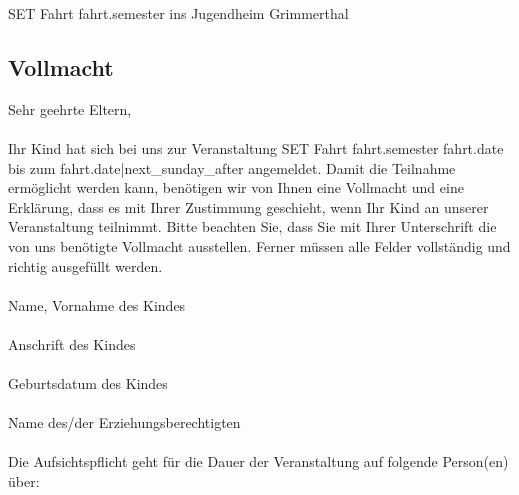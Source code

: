 {%
{%
{%

{%
SET Fahrt {{ fahrt.semester }} ins Jugendheim Grimmerthal {%

{%
\begin{Form}
    \subsection*{Vollmacht}
    Sehr geehrte Eltern,\\
    \\
    Ihr Kind hat sich bei uns zur Veranstaltung SET Fahrt {{ fahrt.semester }} {{ fahrt.date }} bis zum {{ fahrt.date|next_sunday_after }} angemeldet. Damit die Teilnahme ermöglicht werden kann, benötigen wir von Ihnen eine
    Vollmacht und eine Erklärung, dass es mit Ihrer Zustimmung geschieht, wenn Ihr Kind an unserer
    Veranstaltung teilnimmt. Bitte beachten Sie, dass Sie mit Ihrer Unterschrift die von uns benötigte
    Vollmacht ausstellen. Ferner müssen alle Felder vollständig und richtig ausgefüllt werden.\\
    \\
    \TextField[charsize={12pt},multiline=true,height={1cm},width={\linewidth},name={name1},bordercolor={0.2 0.2 0.7},default={ {{ participant.surname|latex_escape }}, {{ participant.firstname|latex_escape }}}]{}\newline
    Name, Vornahme des Kindes\\
    \\
    \TextField[charsize={12pt},multiline=true,height={1cm},width={\linewidth},name={adress},bordercolor={0.2 0.2 0.7}]{}\newline
    Anschrift des Kindes\\
    \\
    \TextField[charsize={12pt},multiline=true,height={1cm},width={\linewidth},name={birthday},bordercolor={0.2 0.2 0.7},default={ {{ participant.birthday }}}]{}\newline
    Geburtsdatum des Kindes\\
    \\
    \TextField[charsize={12pt},multiline=true,height={1cm},width={\linewidth},name={guardian1},bordercolor={0.2 0.2 0.7}]{}\newline
    Name des/der Erziehungsberechtigten\\
    \\
    Die Aufsichtspflicht geht für die Dauer der Veranstaltung auf folgende Person(en) über:\\

\end{Form}}}}}}}
